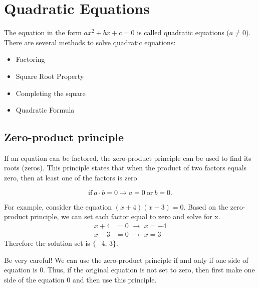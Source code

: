 \chapter{Quadratic Equations}
%
The equation in the form $ax^2+bx+c=0$ is called quadratic equations ($a\neq 0$). There are 
several methods to solve quadratic equations:
\begin{itemize}
	\item Factoring
	\item Square Root Property
	\item Completing the square
	\item Quadratic Formula
\end{itemize}
\section{Zero-product principle}
If an equation can be factored, the zero-product principle can be used to find its roots (zeros). This principle states that when the product of two factors equals zero, then at
least one of the factors is zero
\begin{tcolorbox}[title=Zero-product principle,         
                    fonttitle=\bfseries,
                    colframe=blue!70!red,
                    colback=white]
    \begin{equation}
           \text{if}\  a\cdot b=0 \longrightarrow a=0\ \text{or}\  b=0.
           \label{zero_product}
    \end{equation}
\end{tcolorbox}
For example, consider the equation $(x+4)(x-3)=0$. Based on the zero-product principle, we can set each factor equal to zero and solve for x.
\begin{align*}
        x+4 &=0\,\,\longrightarrow\,\, x=-4\\
        x-3 &=0\,\,\longrightarrow\,\, x=3
\end{align*}
Therefore the solution set is $\{-4,\,3\}$.
\begin{nt}
    Be very careful! We can use the zero-product principle if and only if one side of equation is 0. Thus, if the original equation is not set to zero, then first make one side of the equation 0 and then use this principle.
\end{nt}
